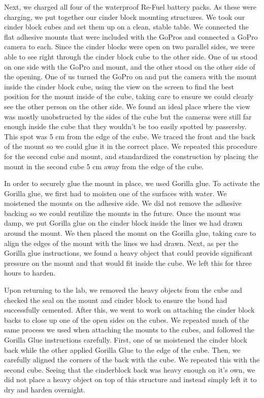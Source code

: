 \documentclass{article}\usepackage[]{graphicx}\usepackage[]{color}
\begin{document}
Next, we charged all four of the waterproof Re-Fuel battery packs. As these were charging, we put together our cinder block mounting structures. We took our cinder block cubes and set them up on a clean, stable table. We connected the flat adhesive mounts that were included with the GoPros and connected a GoPro camera to each. Since the cinder blocks were open on two parallel sides, we were able to see right through the cinder block cube to the other side. One of us stood on one side with the GoPro and mount, and the other stood on the other side of the opening. One of us turned the GoPro on and put the camera with the mount inside the cinder block cube, using the view on the screen to find the best position for the mount inside of the cube, taking care to ensure we could clearly see the other person on the other side. We found an ideal place where the view was mostly unobstructed by the sides of the cube but the cameras were still far enough inside the cube that they wouldn't be too easily spotted by passersby. This spot was 5 cm from the edge of the cube. We traced the front and the back of the mount so we could glue it in the correct place. We repeated this procedure for the second cube and mount, and standardized the construction by placing the mount in the second cube 5 cm away from the edge of the cube. 

In order to securely glue the mount in place, we used Gorilla glue. To activate the Gorilla glue, we first had to moisten one of the surfaces with water. We moistened the mounts on the adhesive side. We did not remove the adhesive backing so we could reutilize the mounts in the future. Once the mount was damp, we put Gorilla glue on the cinder block inside the lines we had drawn around the mount. We then placed the mount on the Gorilla glue, taking care to align the edges of the mount with the lines we had drawn. Next, as per the Gorilla glue instructions, we found a heavy object that could provide significant pressure on the mount and that would fit inside the cube. We left this for three hours to harden.

Upon returning to the lab, we removed the heavy objects from the cube and checked the seal on the mount and cinder block to ensure the bond had successfully cemented. After this, we went to work on attaching the cinder block backs to close up one of the open sides on the cubes. We repeated much of the same process we used when attaching the mounts to the cubes, and followed the Gorilla Glue instructions carefully. First, one of us moistened the cinder block back while the other applied Gorilla Glue to the edge of the cube. Then, we carefully aligned the corners of the back with the cube. We repeated this with the second cube. Seeing that the cinderblock back was heavy enough on it's own, we did not place a heavy object on top of this structure and instead simply left it to dry and harden overnight.
\end{document}
